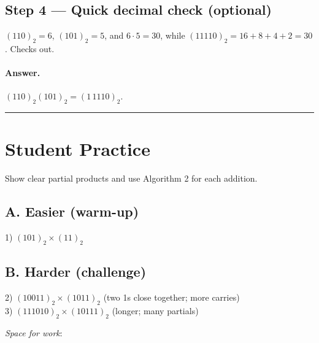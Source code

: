 \documentclass[12pt]{article}
\begin{document}
\subsection*{Step 4 — Quick decimal check (optional)}
$(110)_2=6$, $(101)_2=5$, and $6\cdot 5=30$, while $(11110)_2=16+8+4+2=30$. Checks out.

\paragraph{Answer.} $(110)_2(101)_2=(1\,1110)_2$.

\bigskip
\hrule
\bigskip

\section*{Student Practice}
Show clear partial products and use Algorithm 2 for each addition.

\subsection*{A. Easier (warm-up)}
1) $(101)_2 \times (11)_2$

\subsection*{B. Harder (challenge)}
2) $(10011)_2 \times (1011)_2$ \hfill (two 1s close together; more carries)\\
3) $(111010)_2 \times (10111)_2$ \hfill (longer; many partials)

\bigskip
\textit{Space for work}:

\vfill
\end{document}
